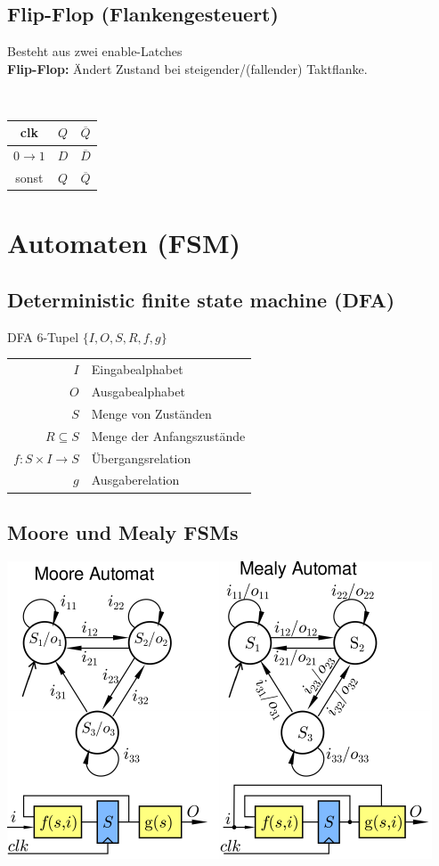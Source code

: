 \documentclass[6pt,a4paper]{scrartcl}
\renewcommand{\emph}[1]{\textsf{\textbf{#1}}}
\newcommand{\eset}[1]{\ensuremath{\bigl\{#1\bigr\}}}								%
\newcommand{\ol}[1]{\ensuremath{\overline{#1}}}									%
\newcommand{\ra}[0]{\ensuremath{\rightarrow}} 									%
\begin{document}
\begin{multicols*}{3}
	\subsection{Flip-Flop (Flankengesteuert)}
		\parbox{5cm}{
			Besteht aus zwei enable-Latches \\
			\emph{Flip-Flop:} Ändert Zustand bei steigender/(fallender) Taktflanke.\\
		}
		\parbox{.5cm}{\ }
		\parbox{2cm}{
			\begin{tabular}{c|c|c} clk & $Q$ & $\ol Q$ \\ \hline $0 \ra 1$ & $D$ & $\ol D$ \\ sonst & $Q$ & $\ol Q$ \end{tabular}
		}


\section{Automaten (FSM)} %
\subsection{Deterministic finite state machine (DFA)}
DFA 6-Tupel $\eset{I, O, S, R, f, g}$ \\

\begin{tabular}{r | l} 
$I$ & Eingabealphabet \\
$O$ &  Ausgabealphabet \\
$S$ & Menge von Zuständen \\
$R \subseteq S$ &  Menge der Anfangszustände \\
$f: S \times I \ra S$  &  Übergangsrelation \\
$g$ & Ausgaberelation \\
\end{tabular}
\subsection{Moore und Mealy FSMs}
\includegraphics{img/ds/automaten.pdf}\\


\end{multicols*}
\end{document}
